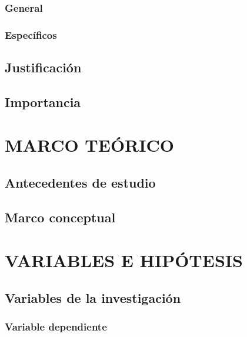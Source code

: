\documentclass[12pt,a4paper,oneside]{report}
\begin{document}
\subsection{General}

\subsection{Específicos}

\section{Justificación}

\section{Importancia}



\chapter{MARCO TEÓRICO}

\section{Antecedentes de estudio}

\section{Marco conceptual}



\chapter{VARIABLES E HIPÓTESIS}

\section{Variables de la investigación}

\subsection{Variable dependiente}
\end{document}

